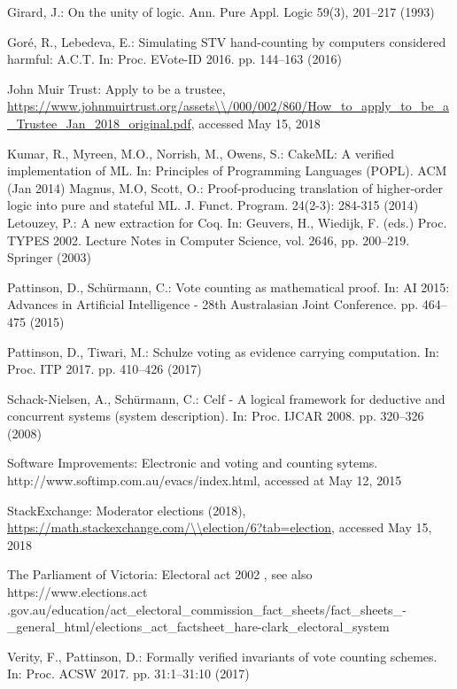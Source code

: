 \documentclass{llncs}
\begin{document}
\begin{thebibliography}{10}
Girard, J.: On the unity of logic. Ann. Pure Appl. Logic  59(3),  201--217
  (1993)

Gor{\'{e}}, R., Lebedeva, E.: Simulating {STV} hand-counting by computers
  considered harmful: {A.C.T}. In: Proc. EVote-ID 2016. pp. 144--163 (2016)

{John Muir Trust}: Apply to be a trustee,
  \url{https://www.johnmuirtrust.org/assets\\/000/002/860/How\_to\_apply\_to\_be\_a\_Trustee\_Jan\_2018\_original.pdf},
accessed May 15, 2018

Kumar, R., Myreen, M.O., Norrish, M., Owens, S.: {CakeML}: A verified
  implementation of {ML}. In: Principles of Programming Languages ({POPL}). ACM
  (Jan 2014)
Magnus, M.O, Scott, O.:
Proof-producing translation of higher-order logic into pure and stateful ML. J. Funct. Program. 24(2-3): 284-315 (2014)
Letouzey, P.: A new extraction for {Coq}. In: Geuvers, H., Wiedijk, F. (eds.)
  Proc. TYPES 2002. Lecture Notes in Computer Science, vol. 2646, pp. 200--219.
  Springer (2003)

Pattinson, D., Sch{\"{u}}rmann, C.: Vote counting as mathematical proof. In:
  {AI} 2015: Advances in Artificial Intelligence - 28th Australasian Joint
  Conference. pp. 464--475 (2015)

Pattinson, D., Tiwari, M.: Schulze voting as evidence carrying computation. In:
  Proc. ITP 2017. pp. 410--426 (2017)

Schack{-}Nielsen, A., Sch{\"{u}}rmann, C.: Celf - {A} logical framework for
  deductive and concurrent systems (system description). In: Proc. IJCAR 2008.
  pp. 320--326 (2008)

{Software Improvements}: Electronic and voting and counting sytems. http://www.softimp.com.au/evacs/index.html, accessed at May 12, 2015

StackExchange: Moderator elections (2018),
  \url{https://math.stackexchange.com/\\election/6?tab=election}, accessed May
  15, 2018

{The Parliament of Victoria}: Electoral act 2002 , see also https://www.elections.act\\.gov.au/education/act\_electoral\_commission\_fact\_sheets/fact\_sheets\_-\_general\_html/elections\_act\_factsheet\_hare-clark\_electoral\_system

Verity, F., Pattinson, D.: Formally verified invariants of vote counting
  schemes. In: Proc. ACSW 2017. pp. 31:1--31:10 (2017)

\end{thebibliography}
\end{document}
